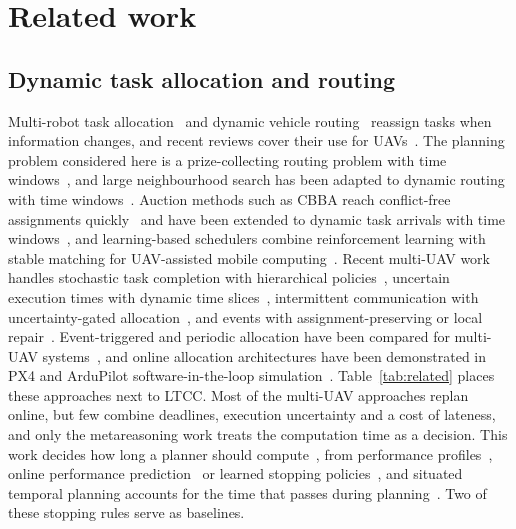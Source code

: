 \documentclass[a4paper,fleqn]{cas-dc}
\newcommand{\mname}{LTCC}  %
\newcounter{prop}
\begin{document}
\section{Related work}\label{sec:related}
\subsection{Dynamic task allocation and routing}
Multi-robot task allocation~\cite{gerkey2004formal,chakraa2023mrta} and dynamic vehicle
routing~\cite{psaraftis2016dynamic,soeffker2022review} reassign tasks when information changes, and recent reviews
cover their use for UAVs~\cite{skaltsis2023review,rojasviloria2021drones}. The planning problem considered here is a
prize-collecting routing problem with time windows~\cite{solomon1987algorithms,vansteenwegen2011orienteering}, and large
neighbourhood search has been adapted to dynamic routing with time windows~\cite{alnsdvrp2024}. Auction methods such
as CBBA reach conflict-free assignments quickly~\cite{choi2009consensus} and have been extended to dynamic task
arrivals with time windows~\cite{wang2022phases}, and learning-based schedulers combine reinforcement learning with
stable matching for UAV-assisted mobile computing~\cite{zhao2025throughput}. Recent multi-UAV work handles stochastic task completion with hierarchical
policies~\cite{choudhury2022dynamic}, uncertain execution times with dynamic time slices~\cite{huang2024dynamic},
intermittent communication with uncertainty-gated allocation~\cite{ucdg2026drones}, and events with
assignment-preserving or local repair~\cite{hwang2026apr,shen2026localrepair}. Event-triggered and periodic allocation
have been compared for multi-UAV systems~\cite{cong2026event}, and online allocation architectures have been
demonstrated in PX4 and ArduPilot software-in-the-loop simulation~\cite{calvo2025heterogeneous,ali2026sitl}. Table~\ref{tab:related}
places these approaches next to \mname{}. Most of the multi-UAV approaches replan online, but few combine deadlines,
execution uncertainty and a cost of lateness, and only the metareasoning work treats the computation time as a
decision. This work decides how long a planner should
compute~\cite{zilberstein1996using,herrmann2023metareasoning}, from performance profiles~\cite{boddy1994deliberation},
online performance prediction~\cite{svegliato2018meta} or learned stopping policies~\cite{sung2021quit}, and situated
temporal planning accounts for the time that passes during planning~\cite{cashmore2018clock,shperberg2021situated}. Two
of these stopping rules serve as baselines.
\end{document}
